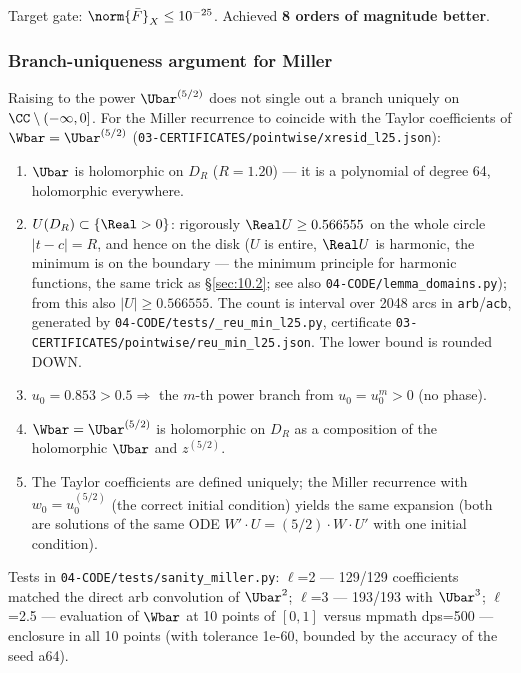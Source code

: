Target gate: $\norm{\bar{F}}_X \le 10^{-25}$. Achieved \textbf{8 orders of
magnitude better}.

\subsubsection{Branch-uniqueness argument for Miller}
\label{sec:5.3.2}

Raising to the power $\Ubar^{(5/2)}$ does not single out a branch uniquely on
$\CC\setminus (-\infty, 0]$. For the Miller recurrence to coincide with the
Taylor coefficients of $\Wbar = \Ubar^{(5/2)}$
(\texttt{03-\allowbreak CERTIFICATES/\allowbreak pointwise/\allowbreak xresid\_\allowbreak l25.json}):

\begin{enumerate}
\item $\Ubar$ is holomorphic on $D_R$ ($R=1.20$) --- it is a polynomial of
degree 64, holomorphic everywhere.
\item $U(D_R) \subset \{\Real>0\}$: rigorously $\Real U \ge 0.566555$ on the
whole circle $|t-c| = R$, and hence on the disk ($U$ is entire, $\Real U$ is
harmonic, the minimum is on the boundary --- the minimum principle for
harmonic functions, the same trick as \S\ref{sec:10.2}; see also
\texttt{04-\allowbreak CODE/\allowbreak lemma\_\allowbreak domains.py}); from this also $|U| \ge 0.566555$. The
count is interval over 2048 arcs in \texttt{arb}/\texttt{acb}, generated by
\texttt{04-\allowbreak CODE/\allowbreak tests/\allowbreak \_\allowbreak reu\_\allowbreak min\_\allowbreak l25.py}, certificate
\texttt{03-\allowbreak CERTIFICATES/\allowbreak pointwise/\allowbreak reu\_\allowbreak min\_\allowbreak l25.json}. The lower bound is
rounded DOWN.
\item $u_0 = 0.853 > 0.5 \Rightarrow$ the $m$-th power branch from $u_0 = u_0^m >
0$ (no phase).
\item $\Wbar = \Ubar^{(5/2)}$ is holomorphic on $D_R$ as a composition of the
holomorphic $\Ubar$ and $z^{(5/2)}$.
\item The Taylor coefficients are defined uniquely; the Miller recurrence with
$w_0 = u_0^{(5/2)}$ (the correct initial condition) yields the same expansion
(both are solutions of the same ODE $W'\cdot U = (5/2)\cdot W\cdot U'$ with one
initial condition).
\end{enumerate}

Tests in \texttt{04-\allowbreak CODE/\allowbreak tests/\allowbreak sanity\_\allowbreak miller.py}: $\ell$=2 --- 129/129
coefficients matched the direct arb convolution of $\Ubar^{2}$; $\ell$=3 ---
193/193 with $\Ubar^{3}$; $\ell$=2.5 --- evaluation of $\Wbar$ at 10 points of
$[0,1]$ versus mpmath dps=500 --- enclosure in all 10 points (with tolerance
1e-60, bounded by the accuracy of the seed a64).

